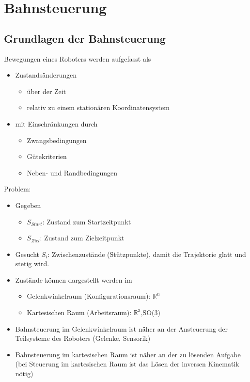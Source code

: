 \documentclass[paper=a4, fontsize=11pt]{scrartcl} %
\numberwithin{equation}{section} %
\numberwithin{figure}{section} %
\numberwithin{table}{section} %
\begin{document}
\section{Bahnsteuerung}

\subsection{Grundlagen der Bahnsteuerung}

Bewegungen eines Roboters werden aufgefasst als
\begin{itemize}
\item Zustandsänderungen
\begin{itemize}
\item über der Zeit
\item relativ zu einem stationären Koordinatensystem
\end{itemize}
\item mit Einschränkungen durch
\begin{itemize}
\item Zwangsbedingungen
\item Gütekriterien
\item Neben- und Randbedingungen
\end{itemize}
\end{itemize}

Problem:
\begin{itemize}
\item Gegeben
\begin{itemize}
\item $S_{Start}$: Zustand zum Startzeitpunkt
\item $S_{Ziel}$: Zustand zum Zielzeitpunkt
\end{itemize}
\item Gesucht $S_i$: Zwischenzustände (Stützpunkte), damit die Trajektorie glatt und stetig wird.
\end{itemize}

\begin{itemize}
\item Zustände können dargestellt werden im
\begin{itemize}
\item Gelenkwinkelraum (Konfigurationsraum): $\mathbb{R}^n$
\item Kartesischen Raum (Arbeitsraum): $\mathbb{R}^3$,SO(3)
\end{itemize}
\item Bahnsteuerung im Gelenkwinkelraum ist näher an der Ansteuerung der Teilsysteme des Roboters (Gelenke, Sensorik)
\item Bahnsteuerung im kartesischen Raum ist näher an der zu lösenden Aufgabe (bei Steuerung im kartesischen Raum ist das Lösen der inversen Kinematik nötig)
\end{itemize}
\end{document}
